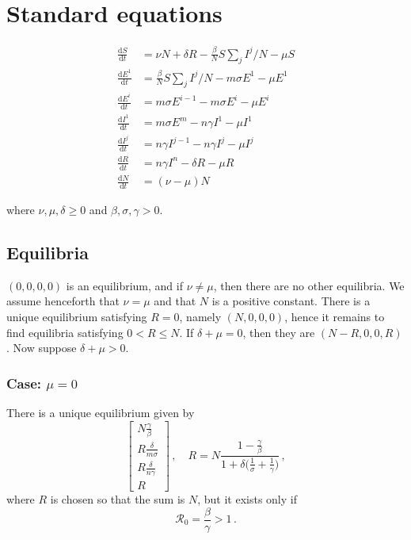 \documentclass[fleqn]{article}
\begin{document}
\setlength{\parindent}{0in}
\setlength{\parskip}{0.2in}

\section{Standard equations}

\begin{subequations}
\begin{align}
  \frac{\text{d} S    }{\text{d} t}
  &= \nu N + \delta R - \frac{\beta}{N} S \sum\nolimits_{j} I^{j} / N - \mu S \\
  \frac{\text{d} E^{1}}{\text{d} t}
  &= \frac{\beta}{N} S \sum\nolimits_{j} I^{j} / N - m \sigma E^{1} - \mu E^{1} \\
  \frac{\text{d} E^{i}}{\text{d} t}
  &= m \sigma E^{i-1} - m \sigma E^{i} - \mu E^{i} \\
  \frac{\text{d} I^{1}}{\text{d} t}
  &= m \sigma E^{m} - n \gamma I^{1} - \mu I^{1} \\
  \frac{\text{d} I^{j}}{\text{d} t}
  &= n \gamma I^{j-1} - n \gamma I^{j} - \mu I^{j} \\
  \frac{\text{d} R    }{\text{d} t}
  &= n \gamma I^{n} - \delta R - \mu R \\
  \frac{\text{d} N    }{\text{d} t}
  &= (\nu - \mu) N
\end{align}
\end{subequations}

where $\nu,\mu,\delta \geq 0$ and $\beta,\sigma,\gamma > 0$.

\subsection{Equilibria}

$(0, 0, 0, 0)$ is an equilibrium, and if $\nu \neq \mu$, then there are
no other equilibria.  We assume henceforth that $\nu = \mu$ and that $N$
is a positive constant.  There is a unique equilibrium satisfying
$R = 0$, namely $(N, 0, 0, 0)$, hence it remains to find equilibria
satisfying $0 < R \leq N$.  If $\delta + \mu = 0$, then they are
$(N - R, 0, 0, R)$.  Now suppose $\delta + \mu > 0$.

\subsubsection{Case: $\mu = 0$}

There is a unique equilibrium given by
\begin{equation}
\begin{bmatrix}
  N \frac{\gamma}{\beta} \\
  R \frac{\delta}{m \sigma} \\
  R \frac{\delta}{n \gamma} \\
  R
\end{bmatrix}
\,,\quad
R = N \frac{1 - \frac{\gamma}{\beta}}{1 + \delta \big(\frac{1}{\sigma} + \frac{1}{\gamma}\big)}\,,
\end{equation}
where $R$ is chosen so that the sum is $N$, but it exists only if
\begin{equation}
\mathcal{R}_{0} = \frac{\beta}{\gamma} > 1\,.
\end{equation}
\end{document}
